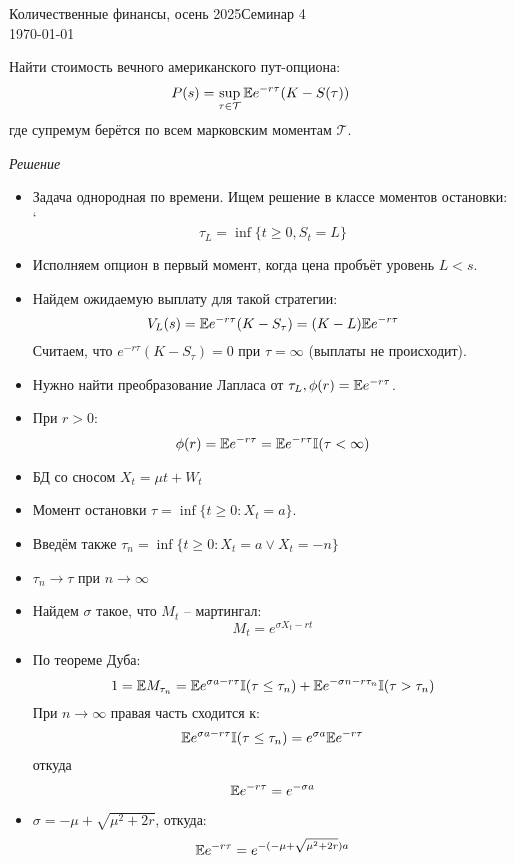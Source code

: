 \documentclass[12pt]{article}
\begin{document}
\noindent Количественные финансы, осень 2025\hfill Семинар 4\\
\today

\hrulefill


\begin{problem}
    Найти стоимость вечного американского пут-опциона:
    $$
        P(s) = \sup_{\tau \in \mathcal{T}} \mathbb{E} e^{-r\tau} (K-S(\tau))
    $$где супремум берётся по всем марковским моментам $\mathcal{T}$.
\end{problem}

\textit{Решение}

    \begin{itemize}

        \item Задача однородная по времени. Ищем решение в классе моментов остановки:
`        $$
            \tau_L = \inf\{t \geq 0, S_t = L\}
        $$
        \item Исполняем опцион в первый момент, когда цена пробъёт уровень $L < s$.
        \item Найдем ожидаемую выплату для такой стратегии:
        $$
            V_L(s) = \mathbb{E} e^{-r\tau}(K-S_{\tau})
            = (K-L)\mathbb{E} e^{-r\tau}
        $$Считаем, что $e^{-r\tau}(K-S_{\tau})=0$ при $\tau = \infty$ (выплаты не происходит).
        \item Нужно найти преобразование Лапласа от $\tau_L, \phi(r) = \mathbb{E} e^{-r\tau}$.
        \item При $r > 0$:
        $$
            \phi(r) = \mathbb{E} e^{-r\tau} = \mathbb{E} e^{-r\tau} \mathbb{I}(\tau < \infty)
        $$
        \item БД со сносом $X_t = \mu t + W_t$
        \item Момент остановки $\tau = \inf\{t \geq 0: X_t = a\}$. 
        \item Введём также $\tau_n = \inf\{t \geq 0: X_t = a \lor X_t = -n\}$
        \item $\tau_n \to \tau$ при $n\to\infty$
        \item Найдем $\sigma$ такое, что $M_t$ -- мартингал:
        $$
            M_t = e^{\sigma X_t - r t}
        $$
        \item По теореме Дуба:
        $$
            1 = \mathbb{E} M_{\tau_n} = \mathbb{E} e^{\sigma a - r\tau} \mathbb{I}(\tau \leq \tau_n)
            + \mathbb{E} e^{-\sigma n - r\tau_n} \mathbb{I}(\tau > \tau_n)
        $$ При $n\to \infty$ правая часть сходится к:
        $$
            \mathbb{E} e^{\sigma a - r\tau} \mathbb{I}(\tau \leq \tau_n) = 
            e^{\sigma a} \mathbb{E} e^{-r\tau}
        $$откуда
        $$
            \mathbb{E} e^{-r\tau} = e^{-\sigma a}
        $$
        \item $\sigma = -\mu + \sqrt{\mu^2 + 2r}$, откуда:
        $$
        \mathbb{E} e^{-r\tau} = e^{-(-\mu + \sqrt{\mu^2 + 2r}) a}
        $$
    \end{itemize}
\end{document}
